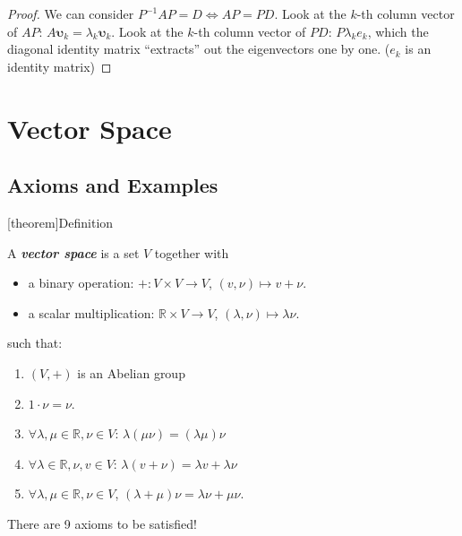 \documentclass[12pt]{report}
\theoremstyle{definition}
\begin{document}
\begin{proof}
    We can consider $P^{-1}AP = D \iff AP = PD$.
    Look at the $k$-th column vector of $AP$: $A\mathbf{\upsilon}_k = \lambda_k \mathbf{\upsilon}_k$.
    Look at the $k$-th column vector of $PD$: $P\lambda_k e_k$, which 
    the diagonal identity matrix ``extracts'' out the eigenvectors one by one.
    ($e_k$ is an identity matrix)
\end{proof}

\section{Vector Space}

\subsection{Axioms and Examples}

[theorem]{Definition}
\begin{vector space}
    A \textbf{\emph{vector space}} is a set $V$ together with
                \begin{itemize}
                        \item a binary operation: $+:V\times V \rightarrow{} V$,
                            $(v, \nu) \mapsto v + \nu$.
                        \item a scalar multiplication: $\mathbb{R}\times V \rightarrow{} V$,
                            $(\lambda, \nu) \mapsto \lambda \nu$.
                \end{itemize}
              such that:
              \begin{enumerate}[label = (\arabic*)]
                  \item $(V,+)$ is an Abelian group
                  \item $1 \cdot \nu = \nu$.
                  \item $\forall \lambda, \mu \in \mathbb{R}, \nu \in V$:
                      $\lambda(\mu\nu) = (\lambda\mu)\nu$
                  \item $\forall \lambda \in \mathbb{R}, \nu,v \in V$:
                      $\lambda(v +\nu) = \lambda v + \lambda\nu$
                  \item $\forall \lambda, \mu \in \mathbb{R}, \nu \in V$,
                      $(\lambda + \mu)\nu = \lambda\nu + \mu\nu$.
              \end{enumerate}
              There are 9 axioms to be satisfied!
\end{vector space}
\end{document}
